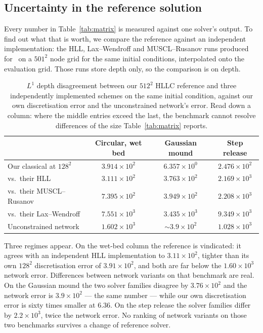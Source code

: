 \documentclass[11pt]{article}
\begin{document}
\subsection{Uncertainty in the reference solution}
\label{sec:refcheck}

Every number in Table~\ref{tab:matrix} is measured against one solver's output.
To find out what that is worth, we compare the reference against an
independent implementation: the HLL, Lax--Wendroff and MUSCL--Rusanov runs
produced for~\cite{dambreak2026comparative} on a $501^2$ node grid for the
same initial conditions, interpolated onto the evaluation grid. Those runs
store depth only, so the comparison is on depth.

\begin{table}[htbp]
\centering
\caption{$L^1$ depth disagreement between our $512^2$ HLLC reference and three
independently implemented schemes on the same initial condition, against our
own discretisation error and the unconstrained network's error. Read down a
column: where the middle entries exceed the last, the benchmark cannot resolve
differences of the size Table~\ref{tab:matrix} reports.}
\label{tab:crosscheck}
\begin{tabular}{lccc}
\toprule
 & Circular, wet bed & Gaussian mound & Step release \\
\midrule
Our classical at $128^2$      & $3.914\times10^{2}$ & $6.357\times10^{0}$ & $2.476\times10^{2}$ \\
\midrule
vs.\ their HLL                & $3.111\times10^{2}$ & $3.763\times10^{2}$ & $2.169\times10^{3}$ \\
vs.\ their MUSCL--Rusanov     & $7.395\times10^{2}$ & $3.949\times10^{2}$ & $2.208\times10^{3}$ \\
vs.\ their Lax--Wendroff      & $7.551\times10^{3}$ & $3.435\times10^{3}$ & $9.349\times10^{3}$ \\
\midrule
Unconstrained network         & $1.602\times10^{3}$ & ${\sim}3.9\times10^{2}$ & $1.028\times10^{3}$ \\
\bottomrule
\end{tabular}
\end{table}

Three regimes appear. On the wet-bed column the reference is vindicated: it
agrees with an independent HLL implementation to $3.11\times10^2$, tighter
than its own $128^2$ discretisation error of $3.91\times10^2$, and both are
far below the $1.60\times10^3$ network error. Differences between network
variants on that benchmark are real. On the Gaussian mound the two solver
families disagree by $3.76\times10^2$ and the network error is
$3.9\times10^2$ --- the same number --- while our own discretisation error is
sixty times smaller at $6.36$. On the step release the solver families differ
by $2.2\times10^3$, twice the network error. No ranking of network variants on
those two benchmarks survives a change of reference solver.
\end{document}
